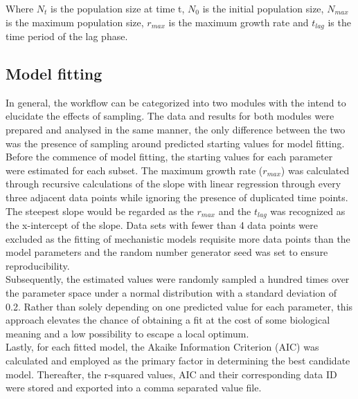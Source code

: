 \documentclass[11pt, a4paper]{article} %
\begin{document}
Where $N_t$ is the population size at time t, $N_0$ is the initial population size, $N_{max}$ is the maximum population size, $r_{max}$ is the maximum growth rate and $t_{lag}$ is the time period of the lag phase. 

\subsection{Model fitting}
In general, the workflow can be categorized into two modules with the intend to elucidate the effects of sampling. The data and results for both modules were prepared and analysed in the same manner, the only difference between the two was the presence of sampling around predicted starting values for model fitting.\\

\noindent Before the commence of model fitting, the starting values for each parameter were estimated for each subset. The maximum growth rate ($r_{max}$) was calculated through recursive calculations of the slope with linear regression through every three adjacent data points while ignoring the presence of duplicated time points. The steepest slope would be regarded as the $r_{max}$ and the $t_{lag}$ was recognized as the x-intercept of the slope. Data sets with fewer than 4 data points were excluded as the fitting of mechanistic models requisite more data points than the model parameters and the random number generator seed was set to ensure reproducibility.\\

\noindent Subsequently, the estimated values were randomly sampled a hundred times over the parameter space under a normal distribution with a standard deviation of 0.2. Rather than solely depending on one predicted value for each parameter, this approach elevates the chance of obtaining a fit at the cost of some biological meaning and a low possibility to escape a local optimum.\\

\noindent Lastly, for each fitted model, the Akaike Information Criterion (AIC) was calculated and employed as the primary factor in determining the best candidate model. Thereafter, the r-squared values, AIC and their corresponding data ID were stored and exported into a comma separated value file.
\end{document}

